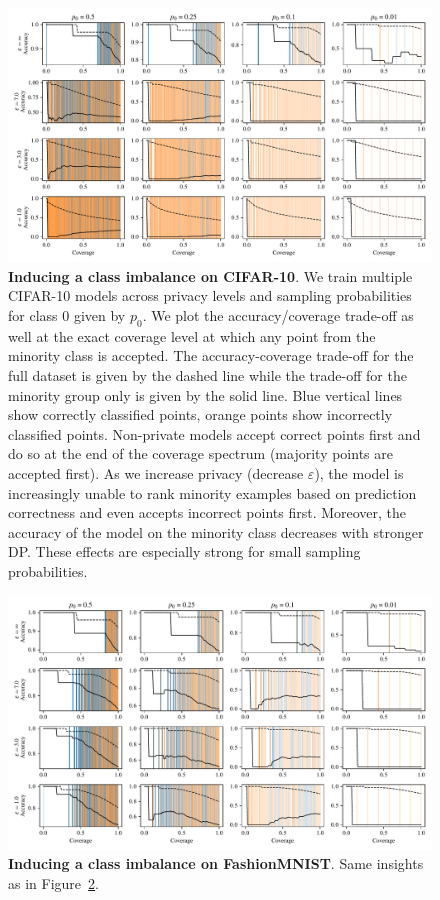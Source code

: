 \begin{figure}[t]
  \centering
\includegraphics[width=\linewidth]{figs/sptd_dp/cifar10_classimb.pdf}
\caption[Inducing a class imbalance on CIFAR-10]{\textbf{Inducing a class imbalance on CIFAR-10}. We train multiple CIFAR-10 models across privacy levels and sampling probabilities for class 0 given by $p_0$. We plot the accuracy/coverage trade-off as well at the exact coverage level at which any point from the minority class is accepted. The accuracy-coverage trade-off for the full dataset is given by the dashed line while the trade-off for the minority group only is given by the solid line. Blue vertical lines show correctly classified points, orange points show incorrectly classified points. Non-private models accept correct points first and do so at the end of the coverage spectrum (\ie majority points are accepted first). As we increase privacy (\ie decrease $\varepsilon$), the model is increasingly unable to rank minority examples based on prediction correctness and even accepts incorrect points first. Moreover, the accuracy of the model on the minority class decreases with stronger DP. These effects are especially strong for small sampling probabilities.}
\label{fig:cifar10_classimb}
\end{figure}

\begin{figure}[t]
  \centering
	  \includegraphics[width=\linewidth]{figs/sptd_dp/fashionmnist_classimb.pdf}
  
\caption[Inducing a class imbalance on FashionMNIST.]{\textbf{Inducing a class imbalance on FashionMNIST}. Same insights as in Figure~\ref{fig:fashionmnist_classimb}.}
\label{fig:fashionmnist_classimb}
\end{figure}

